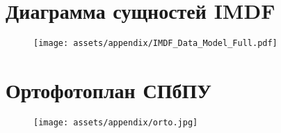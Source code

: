 \chapter{Диаграмма сущностей IMDF}
  \label{appendix:IMDF-ER}
  \begin{figure}[H]
    \texttt{[image: assets/appendix/IMDF\_Data\_Model\_Full.pdf]}
  \end{figure}

  \newpage
\chapter{Ортофотоплан СПбПУ}
  \begin{figure}[H]
    \texttt{[image: assets/appendix/orto.jpg]}
  \end{figure}
